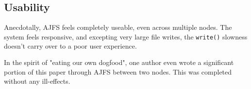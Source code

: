 
\subsection{Usability}

Anecdotally, AJFS feels completely useable, even across multiple nodes. The
system feels responsive, and excepting very large file writes, the
\texttt{write()} slowness doesn't carry over to a poor user experience.

In the spirit of "eating our own dogfood", one author even wrote a significant
portion of this paper through AJFS between two nodes. This was completed without
any ill-effects.

